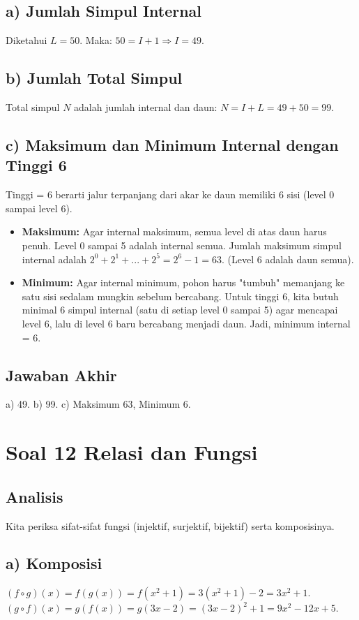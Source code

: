 \documentclass[12pt,a4paper]{article}
\begin{document}
\subsection*{a) Jumlah Simpul Internal}
Diketahui $L = 50$. Maka:
$50 = I + 1 \Rightarrow I = 49$.

\subsection*{b) Jumlah Total Simpul}
Total simpul $N$ adalah jumlah internal dan daun:
$N = I + L = 49 + 50 = 99$.

\subsection*{c) Maksimum dan Minimum Internal dengan Tinggi 6}
Tinggi = 6 berarti jalur terpanjang dari akar ke daun memiliki 6 sisi (level 0 sampai level 6).

\begin{itemize}
    \item \textbf{Maksimum:} Agar internal maksimum, semua level di atas daun harus penuh. Level 0 sampai 5 adalah internal semua. Jumlah maksimum simpul internal adalah $2^0 + 2^1 + ... + 2^5 = 2^6 - 1 = 63$. (Level 6 adalah daun semua).
    \item \textbf{Minimum:} Agar internal minimum, pohon harus "tumbuh" memanjang ke satu sisi sedalam mungkin sebelum bercabang. Untuk tinggi 6, kita butuh minimal 6 simpul internal (satu di setiap level 0 sampai 5) agar mencapai level 6, lalu di level 6 baru bercabang menjadi daun. Jadi, minimum internal = 6.
\end{itemize}

\subsection*{Jawaban Akhir}
a) 49. \quad b) 99. \quad c) Maksimum 63, Minimum 6.

\newpage
\section*{Soal 12 Relasi dan Fungsi}
\subsection*{Analisis}
Kita periksa sifat-sifat fungsi (injektif, surjektif, bijektif) serta komposisinya.

\subsection*{a) Komposisi}
$(f \circ g)(x) = f(g(x)) = f(x^2 + 1) = 3(x^2 + 1) - 2 = 3x^2 + 1$.
$(g \circ f)(x) = g(f(x)) = g(3x - 2) = (3x - 2)^2 + 1 = 9x^2 - 12x + 5$.
\end{document}
